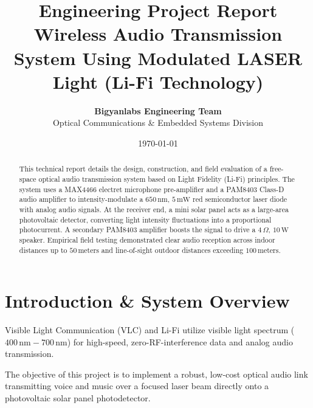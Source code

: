 \documentclass[11pt,a4paper]{article}
\title{\textbf{\Huge Engineering Project Report}\\[0.5em] \Large Wireless Audio Transmission System Using Modulated LASER Light (Li-Fi Technology)}
\author{\textbf{Bigyanlabs Engineering Team}\\ Optical Communications \& Embedded Systems Division}
\date{\today}
\begin{document}
\maketitle
\thispagestyle{empty}

\begin{abstract}
This technical report details the design, construction, and field evaluation of a free-space optical audio transmission system based on Light Fidelity (Li-Fi) principles. The system uses a MAX4466 electret microphone pre-amplifier and a PAM8403 Class-D audio amplifier to intensity-modulate a $650\,\text{nm}$, $5\,\text{mW}$ red semiconductor laser diode with analog audio signals. At the receiver end, a mini solar panel acts as a large-area photovoltaic detector, converting light intensity fluctuations into a proportional photocurrent. A secondary PAM8403 amplifier boosts the signal to drive a $4\,\Omega$, $10\,\text{W}$ speaker. Empirical field testing demonstrated clear audio reception across indoor distances up to $50\,\text{meters}$ and line-of-sight outdoor distances exceeding $100\,\text{meters}$.
\end{abstract}

\newpage
\tableofcontents
\newpage

\section{Introduction \& System Overview}
Visible Light Communication (VLC) and Li-Fi utilize visible light spectrum ($400\,\text{nm} - 700\,\text{nm}$) for high-speed, zero-RF-interference data and analog audio transmission.

The objective of this project is to implement a robust, low-cost optical audio link transmitting voice and music over a focused laser beam directly onto a photovoltaic solar panel photodetector.
\end{document}
